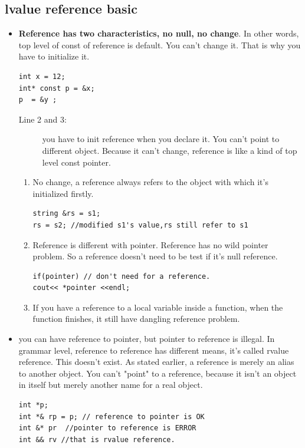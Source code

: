 \documentclass[a4paper,11pt,twoside]{book}
\begin{document}
\subsection{lvalue reference basic}
\begin{itemize}
\item \textbf{Reference has two characteristics, no null, no change}. In other words, top level of const of reference is default. You can't change it. That is why you have to initialize it.
\begin{lstlisting}
int x = 12;
int* const p = &x; 
p  = &y ; 
\end{lstlisting}
\begin{description}
	\item[Line 2 and 3:] you have to init reference when you declare it. You can't point to different object. Because it can't change, reference is like a kind of top level const pointer.
\end{description}

\begin{enumerate}
\item No change, a reference always refers to the object with which it's initialized firstly.
\begin{lstlisting}[numbers = none]
string &rs = s1;
rs = s2; //modified s1's value,rs still refer to s1
\end{lstlisting}

\item Reference is different with pointer. Reference has no wild pointer problem. So a reference doesn't need to be test if it's null reference.
\begin{lstlisting}[numbers=none]
if(pointer) // don't need for a reference.
cout<< *pointer <<endl;
\end{lstlisting}

\item If you have a reference to a local variable inside a function, when the function finishes, it still have dangling reference problem. 
\end{enumerate}

\item you can have reference to pointer, but pointer to reference is illegal. In grammar level, reference to reference has different means, it's called rvalue reference. This doesn't exist. As stated earlier, a reference is merely an alias to another object. You can't "point" to a reference, because it isn't an object in itself but merely another name for a real object. 
\begin{lstlisting}[numbers=none]
int *p;
int *& rp = p; // reference to pointer is OK
int &* pr  //pointer to reference is ERROR
int && rv //that is rvalue reference.
\end{lstlisting}



\end{itemize}
\end{document}
